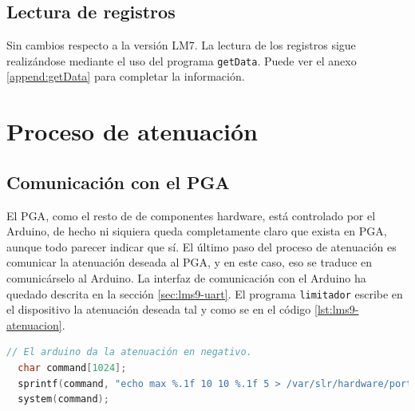 \subsection{Lectura de registros}

Sin cambios respecto a la versión \acrshort{LM7}. La lectura de los registros sigue realizándose mediante el uso del programa \verb|getData|. Puede ver el anexo \ref{append:getData} para completar la información.

\section{Proceso de atenuación} \label{sec:lms7-atenuacion}

\subsection{Comunicación con el \acrshort{PGA}}

El \acrshort{PGA}, como el resto de de componentes hardware, está controlado por el Arduino, de hecho ni siquiera queda completamente claro que exista en \acrshort{PGA}, aunque todo parecer indicar que sí. El último paso del proceso de atenuación es comunicar la atenuación deseada al \acrshort{PGA}, y en este caso, eso se traduce en comunicárselo al Arduino. La interfaz de comunicación con el Arduino ha quedado descrita en la sección \ref{sec:lms9-uart}. El programa \verb|limitador| escribe en el dispositivo la atenuación deseada tal y como se en el código \ref{lst:lms9-atenuacion}. \\

\begin{lstlisting}[language=c++, caption={Comunicación de la atenuación deseada en el \acrshort{LM9}.}, label={lst:lms9-atenuacion}]
  // El arduino da la atenuación en negativo.
  char command[1024];
  sprintf(command, "echo max %.1f 10 10 %.1f 5 > /var/slr/hardware/port", -desiredAt, 0.0f);
  system(command);
\end{lstlisting}
